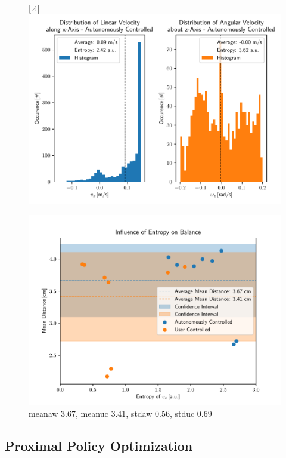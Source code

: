 \begin{figure}[h]
	[.4\linewidth]{\includegraphics[scale=.35]{chapters/05_experiments/02_autonomous_walking/semantic_walk_01_entropy.pdf}}
	\caption{}
	\label{fig::525_aw_additional}
\end{figure}
\begin{figure}[h]
	\centering
	\includegraphics[scale=.6]{chapters/05_experiments/02_autonomous_walking/entropy_against_balance.pdf}
	\caption{meanaw 3.67, meanuc 3.41, stdaw 0.56, stduc 0.69}
	\label{fig::525_entropy_balance}
\end{figure}
\subsection{Proximal Policy Optimization}
